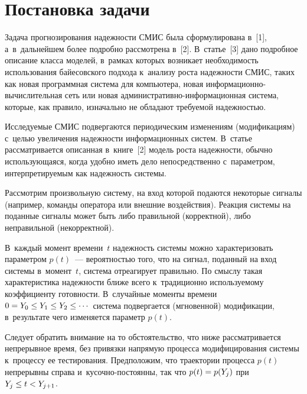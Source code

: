 



\thispagestyle{headings}

\begin{multicols}{2}

\label{st\stat}

\section{Постановка задачи}

Задача прогнозирования надежности СМИС была сформулирована в~[1], а~в~дальнейшем более подробно рассмотрена в~[2].
В~статье~[3] дано подробное описание класса моделей, в~рамках которых возникает
необходимость использования байесовского подхода к~анализу роста надежности СМИС,
таких как новая программная система для компьютера, новая
ин\-фор\-ма\-ци\-он\-но-вы\-чис\-ли\-тель\-ная сеть или новая
ад\-ми\-ни\-стра\-тив\-но-ин\-фор\-ма\-ци\-он\-ная система, которые,
как правило, изначально не обладают требуемой надежностью.

Исследуемые СМИС подвергаются периодическим изменениям (модификациям)
с~целью увеличения надежности информационных систем. В~\mbox{статье} рассматривается
описанная в~книге~[2] модель роста надежности, обычно использующаяся, когда
удобно иметь дело непосредственно с~параметром, интерпретируемым как надежность
сис\-темы.
{

}

Рассмотрим произвольную систему, на вход которой подаются некоторые сигналы
(например, команды оператора или внешние воздействия). Реакция системы на
поданные сигналы может быть либо правильной (корректной), либо неправильной
(некорректной).

В~каждый момент времени~$t$ надежность системы можно характеризовать
параметром $p(t)$~--- вероятностью того, что на сигнал, поданный на вход системы
в~момент~$t$, система отреагирует правильно. По смыслу такая характеристика
надежности ближе всего к~традиционно используемому коэффициенту готовности.
В~случайные моменты времени $0\hm=Y_0\hm\le Y_1 \hm\le Y_2 \le\cdots$ система
подвергается (мгновенной) модификации, в~результате чего изменяется параметр
$p(t)$.

Следует обратить внимание на то обстоятельство, что ниже рассматривается
непрерывное время, без привязки напрямую процесса модифицирования системы
к~процессу ее тестирования. Предположим, что траектории процесса $p(t)$
непрерывны справа и~ку\-соч\-но-по\-сто\-ян\-ны, так что $p(t) \hm= p(Y_j)$ при
$Y_j \hm\le t\hm< Y_{j+1}$.


\end{multicols}
